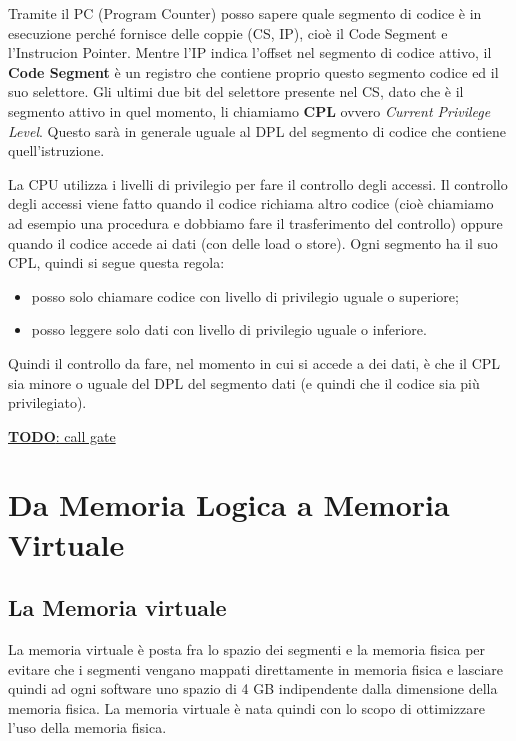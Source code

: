 \documentclass[11pt]{book}
\begin{document}
Tramite il PC (Program Counter) posso sapere quale segmento di codice
\`e in esecuzione perch\'e fornisce delle coppie (CS, IP), cio\`e il
Code Segment e l'Instrucion Pointer. Mentre l'IP indica l'offset nel
segmento di codice attivo, il {\bf Code Segment} \`e un registro che
contiene proprio questo segmento codice ed il suo selettore. Gli
ultimi due bit del selettore presente nel CS, dato che \`e il segmento
attivo in quel momento, li chiamiamo {\bf CPL} ovvero {\em Current
  Privilege Level}. Questo sar\`a in generale uguale al DPL del
segmento di codice che contiene quell'istruzione.

La CPU utilizza i livelli di privilegio per fare il controllo degli
accessi. Il controllo degli accessi viene fatto quando il codice
richiama altro codice (cio\`e chiamiamo ad esempio una procedura e
dobbiamo fare il trasferimento del controllo) oppure quando il codice
accede ai dati (con delle load o store). Ogni segmento ha il suo CPL,
quindi si segue questa regola: 

\begin{itemize}
\item posso solo chiamare codice con livello di privilegio uguale o
  superiore;
\item  posso leggere solo dati con livello di privilegio uguale o
  inferiore.
\end{itemize}

Quindi il controllo da fare, nel momento in cui si accede a dei dati,
\`e che il CPL sia minore o uguale del DPL del segmento dati (e quindi
che il codice sia pi\`u privilegiato).

\par\bigskip

\underline{{\bf TODO}: call gate}

\section{Da Memoria Logica a Memoria Virtuale}

\subsection{La Memoria virtuale}

La memoria virtuale \`e posta fra lo spazio dei segmenti e la memoria
fisica per evitare che i segmenti vengano mappati direttamente in
memoria fisica e lasciare quindi ad ogni software uno spazio di 4 GB
indipendente dalla dimensione della memoria fisica. La memoria
virtuale \`e nata quindi con lo scopo di ottimizzare l'uso della
memoria fisica.
\end{document}
